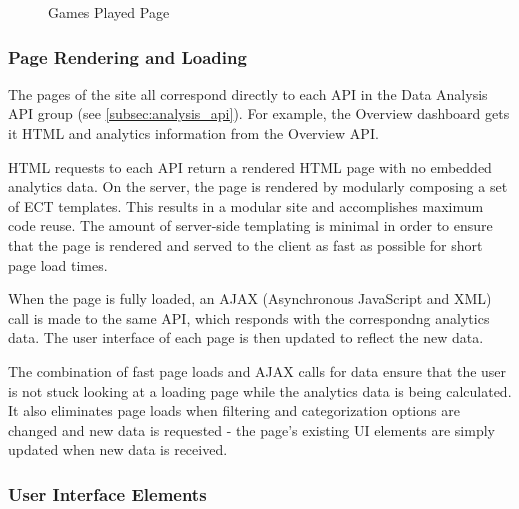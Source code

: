 \begin{figure}[htb]
	\caption{\label{fig:games_played} Games Played Page}
\end{figure}

\subsubsection{Page Rendering and Loading}

The pages of the site all correspond directly to each API in the Data Analysis API group (see \ref{subsec:analysis_api}). For example, the Overview dashboard gets it HTML and analytics information from the Overview API.

HTML requests to each API return a rendered HTML page with no embedded analytics data. On the server, the page is rendered by modularly composing a set of ECT templates. This results in a modular site and accomplishes maximum code reuse. The amount of server-side templating is minimal in order to ensure that the page is rendered and served to the client as fast as possible for short page load times.

When the page is fully loaded, an AJAX (Asynchronous JavaScript and XML) call is made to the same API, which responds with the correspondng analytics data. The user interface of each page is then updated to reflect the new data. 

The combination of fast page loads and AJAX calls for data ensure that the user is not stuck looking at a loading page while the analytics data is being calculated. It also eliminates page loads when filtering and categorization options are changed and new data is requested - the page's existing UI elements are simply updated when new data is received.

\subsubsection{User Interface Elements}


